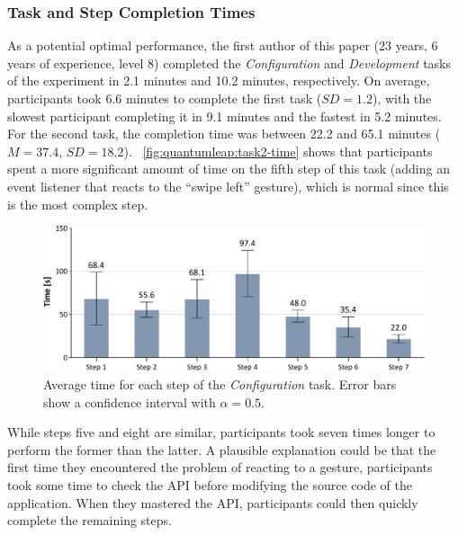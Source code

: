 \subsubsection{Task and Step Completion Times}
As a potential optimal performance, the first author of this paper (23 years, 6 years of experience, level 8)  completed the \textit{Configuration} and \textit{Development} tasks of the experiment in 2.1 minutes and 10.2 minutes, respectively. On average, participants took 6.6 minutes to complete the first task ($SD{=}1.2$), with the slowest participant completing it in 9.1 minutes and the fastest in 5.2 minutes. For the second task, the completion time was between 22.2 and 65.1 minutes ($M{=}37.4$, $SD{=}18.2$). \fig~\ref{fig:quantumleap:task2-time} shows that participants spent a more significant amount of time on the fifth step of this task (\ie adding an event listener that reacts to the ``swipe left'' gesture), which is normal since this is the most complex step.

\begin{figure}[t]
    \centering
    \includegraphics[width=\linewidth]{Figures/QuantumLeap/Evaluation/Task 1 (time).pdf}
    \caption{Average time for each step of the \textit{Configuration} task. Error bars show a confidence interval with $\alpha{=}0.5$.}
    \label{fig:quantumleap:task1-time}
\end{figure}


While steps five and eight are similar, participants took seven times longer to perform the former than the latter. A plausible explanation could be that the first time they encountered the problem of reacting to a gesture, participants took some time to check the API before modifying the source code of the application. When they mastered the API, participants could then quickly complete the remaining steps.



